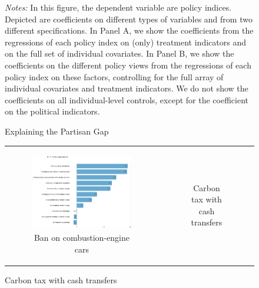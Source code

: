 \documentclass{article}
\begin{document}
\begin{figure}[h!]
{\footnotesize \textit{Notes:} In this figure, the dependent variable are policy indices. Depicted are coefficients on different types of variables and from two different specifications. In Panel A, we show the coefficients from the regressions of each policy index on (only) treatment indicators and on the full set of individual covariates. In Panel B, we show the coefficients on the different policy views from the regressions of each policy index on these factors, controlling for the full array of individual covariates and treatment indicators. We do not show the coefficients on all individual-level controls, except for the coefficient on the political indicators.}
\end{figure}



\begin{figure}[h!]
\begin{center}
	\caption{Explaining the Partisan Gap}
	\caption*{Gelbach decomposition of the partisan gap in support for:}
	\setlength\extrarowheight{-1pt}
	\begin{tabular}{cc}
		\begin{subfigure}{0.5\textwidth}
		\caption{Ban on combustion-engine cars}
			\includegraphics[width=\textwidth]{gelbach_right_standard_D2SD}
		\end{subfigure}&
		\begin{subfigure}{0.5\textwidth}
		\caption{Carbon tax with cash transfers}

\end{subfigure}
\end{tabular}
\end{center}
\end{figure}
\end{document}
